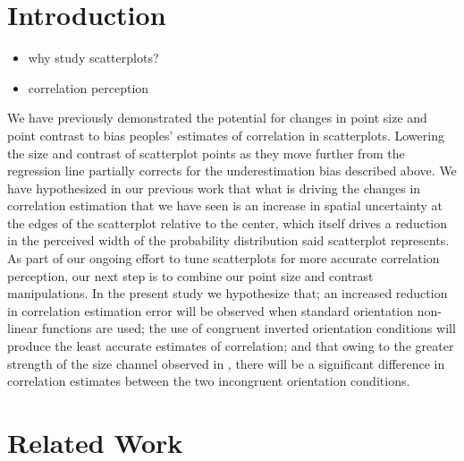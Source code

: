 \documentclass[manuscript, review, anonymous, screen]{acmart}
\providecommand{\tightlist}{%
  \setlength{\itemsep}{0pt}\setlength{\parskip}{0pt}}\usepackage{longtable,booktabs,array}
\begin{document}


\maketitle

\setlength{\parskip}{-0.1pt}

\hypertarget{introduction}{%
\section{Introduction}\label{introduction}}

\begin{itemize}
\tightlist
\item
  why study scatterplots?
\item
  correlation perception
\end{itemize}

We have previously demonstrated the potential for changes in point size
and point contrast to bias peoples' estimates of correlation in
scatterplots. Lowering the size and contrast of scatterplot points as
they move further from the regression line partially corrects for the
underestimation bias described above. We have hypothesized in our
previous work that what is driving the changes in correlation estimation
that we have seen is an increase in spatial uncertainty at the edges of
the scatterplot relative to the center, which itself drives a reduction
in the perceived width of the probability distribution said scatterplot
represents. As part of our ongoing effort to tune scatterplots for more
accurate correlation perception, our next step is to combine our point
size and contrast manipulations. In the present study we hypothesize
that; an increased reduction in correlation estimation error will be
observed when standard orientation non-linear functions are used; the
use of congruent inverted orientation conditions will produce the least
accurate estimates of correlation; and that owing to the greater
strength of the size channel observed in \citet{strain_2023b}, there
will be a significant difference in correlation estimates between the
two incongruent orientation conditions.

\hypertarget{sec-related-work}{%
\section{Related Work}\label{sec-related-work}}
\end{document}

